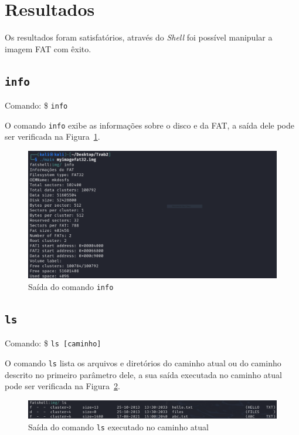 \documentclass[
    12pt,				%
    oneside,   	        %
    a4paper,			%
    english,			%
    french,				%
    spanish,			%
    brazil,				%
    ]{pacotes/abntex2}
\begin{document}
\graphicspath{ {./figuras/resultados} }

\section{Resultados}
\label{sec:resultados}
Os resultados foram satisfatórios, através do \textit{Shell} foi possível manipular a imagem FAT com êxito.


\subsection{\texttt{info}}
\label{subsec:info}
Comando: \$ \texttt{info}
 
O comando \texttt{info} exibe as informações sobre o disco e da FAT, a saída dele pode ser verificada na Figura~\ref{fig:info}.

\begin{figure}[H]
    \centering
    \includegraphics[width=450pt]{0-info.PNG}
    \caption{Saída do comando \texttt{info}}
    \label{fig:info}
\end{figure}


\subsection{\texttt{ls}}
\label{subsec:ls}
Comando: \$ \texttt{ls [caminho]} 

O comando \texttt{ls} lista os arquivos e diretórios do caminho atual ou do caminho descrito no primeiro parâmetro dele, a sua saída executada no caminho atual pode ser verificada na Figura~\ref{fig:ls}.

\begin{figure}[H]
    \centering
    \includegraphics[width=450pt]{figuras/resultados/1-ls.PNG}
    \caption{Saída do comando \texttt{ls} executado no caminho atual}
    \label{fig:ls}
\end{figure}
\end{document}
